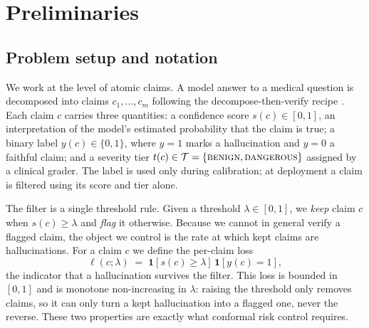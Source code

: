
\section{Preliminaries}
\label{sec:prelim}

\subsection{Problem setup and notation}
\label{sec:setup}
We work at the level of atomic claims. A model answer to a medical question is
decomposed into claims $c_1, \dots, c_m$ following the decompose-then-verify
recipe \citep{min2023factscore, mohri2024conformal}. Each claim $c$ carries three
quantities: a confidence score $s(c) \in [0,1]$, an interpretation of the model's
estimated probability that the claim is true; a binary label $y(c) \in \{0, 1\}$,
where $y=1$ marks a hallucination and $y=0$ a faithful claim; and a severity tier
$t(c) \in \mathcal{T} = \{\textsc{benign}, \textsc{dangerous}\}$ assigned by a
clinical grader. The label is used only during calibration; at deployment a claim
is filtered using its score and tier alone.

The filter is a single threshold rule. Given a threshold $\lambda \in [0,1]$, we
\emph{keep} claim $c$ when $s(c) \ge \lambda$ and \emph{flag} it otherwise.
Because we cannot in general verify a flagged claim, the object we control is the
rate at which kept claims are hallucinations. For a claim $c$ we define the
per-claim loss
\begin{equation}
\ell(c; \lambda) \;=\; \mathbf{1}\!\left[s(c) \ge \lambda\right]\,
\mathbf{1}\!\left[y(c) = 1\right],
\label{eq:loss}
\end{equation}
the indicator that a hallucination survives the filter. This loss is bounded in
$[0,1]$ and is monotone non-increasing in $\lambda$: raising the threshold only
removes claims, so it can only turn a kept hallucination into a flagged one, never
the reverse. These two properties are exactly what conformal risk control requires.

